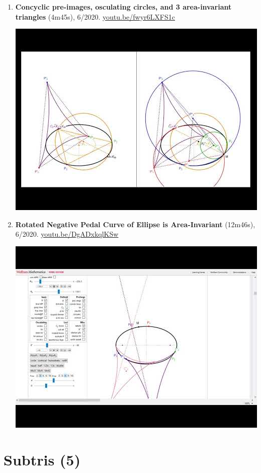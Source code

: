 \documentclass[12pt]{article}
\begin{document}
\begin{enumerate}[resume]
% 
\item \textbf{Concyclic pre-images, osculating circles, and 3 area-invariant triangles} (4m45s), 6/2020. \href{https://youtu.be/fwyr6LXFS1c}{\url{youtu.be/fwyr6LXFS1c}}
\begin{center}\includegraphics[width=.5\textwidth]{pics/fwyr6LXFS1c.jpg}\end{center}
% 
\item \textbf{Rotated Negative Pedal Curve of Ellipse is Area-Invariant} (12m46s), 6/2020. \href{https://youtu.be/DgADxkqlKSw}{\url{youtu.be/DgADxkqlKSw}}
\begin{center}\includegraphics[width=.5\textwidth]{pics/DgADxkqlKSw.jpg}\end{center}
% 
\end{enumerate}

\section{Subtris (5)}
\end{document}
